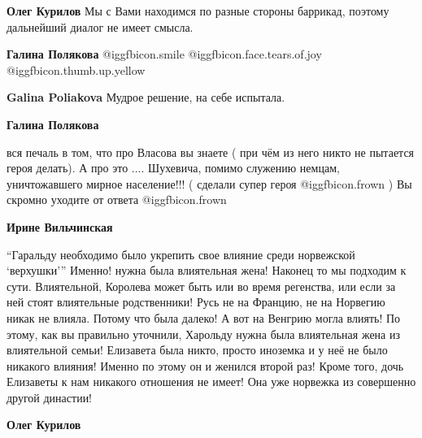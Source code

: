 \begin{itemize}
\begin{itemize}
\begin{itemize} %
\textbf{Олег Курилов} Мы с Вами находимся по разные стороны баррикад, поэтому дальнейший диалог не имеет смысла.

\textbf{Галина Полякова}  @igg{fbicon.smile}   @igg{fbicon.face.tears.of.joy}  @igg{fbicon.thumb.up.yellow} 

\textbf{Galina Poliakova} Мудрое решение, на себе испытала.

\textbf{Галина Полякова} 

вся печаль в том, что про Власова вы знаете ( при чём из него никто не пытается
героя делать). А про это .... Шухевича, помимо служению немцам, уничтожавшего
мирное население!!! ( сделали супер героя  @igg{fbicon.frown}  ) Вы скромно уходите от ответа  @igg{fbicon.frown} 

\end{itemize} %

\textbf{Ирине Вильчинская} 

\enquote{Гаральду необходимо было укрепить свое влияние среди норвежской \enquote{верхушки}}
Именно! нужна была влиятельная жена! Наконец то мы подходим к сути.
Влиятельной, Королева может быть или во время регенства, или если за ней стоят
влиятельные родственники! Русь не на Францию, не на Норвегию никак не влияла.
Потому что была далеко! А вот на Венгрию могла влиять! По этому, как вы
правильно уточнили, Харольду нужна была влиятельная жена из влиятельной семьи!
Елизавета была никто, просто иноземка и у неё не было никакого влияния! Именно
по этому он и женился второй раз! Кроме того, дочь Елизаветы к нам никакого
отношения не имеет! Она уже норвежка из совершенно другой династии!

\begin{itemize} %
\textbf{Олег Курилов} 


\end{itemize}
\end{itemize}
\end{itemize}
